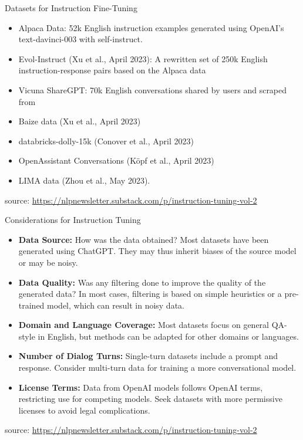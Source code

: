 \documentclass[handout]{beamer}
\begin{document}
\begin{frame}{Datasets for Instruction Fine-Tuning}
\begin{scriptsize}
\begin{itemize}
\item Alpaca Data: 52k English instruction examples generated using OpenAI’s text-davinci-003 with self-instruct.
\item Evol-Instruct (Xu et al., April 2023): A rewritten set of 250k English instruction-response pairs based on the Alpaca data
\item Vicuna ShareGPT: 70k English conversations shared by users and scraped from \item Baize data (Xu et al., April 2023)
\item databricks-dolly-15k (Conover et al., April 2023)
\item OpenAssistant Conversations (Köpf et al., April 2023)
\item LIMA data (Zhou et al., May 2023).
\end{itemize}
source: \url{https://nlpnewsletter.substack.com/p/instruction-tuning-vol-2}
\end{scriptsize}
\end{frame}


\begin{frame}{Considerations for Instruction Tuning}
\scriptsize


\begin{itemize}
    \item \textbf{Data Source:} How was the data obtained? Most datasets have been generated using ChatGPT. They may thus inherit biases of the source model or may be noisy.

    \item \textbf{Data Quality:} Was any filtering done to improve the quality of the generated data? In most cases, filtering is based on simple heuristics or a pre-trained model, which can result in noisy data.

    \item \textbf{Domain and Language Coverage:} Most datasets focus on general QA-style in English, but methods can be adapted for other domains or languages.

    \item \textbf{Number of Dialog Turns:} Single-turn datasets include a prompt and response. Consider multi-turn data for training a more conversational model.

    \item \textbf{License Terms:} Data from OpenAI models follows OpenAI terms, restricting use for competing models. Seek datasets with more permissive licenses to avoid legal complications.
\end{itemize}
source: \url{https://nlpnewsletter.substack.com/p/instruction-tuning-vol-2}
\end{frame}
\end{document}
